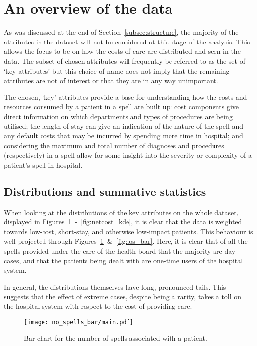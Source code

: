 \section{An overview of the data}\label{sec:overview}

As was discussed at the end of Section~\ref{subsec:structure}, the majority of
the attributes in the dataset will not be considered at this stage of the
analysis. This allows the focus to be on how the costs of care are distributed
and seen in the data. The subset of chosen attributes will frequently be
referred to as the set of `key attributes' but this choice of name does not
imply that the remaining attributes are not of interest or that they are in any
way unimportant.

The chosen, `key' attributes provide a base for understanding how the
costs and resources consumed by a patient in a spell are built up: cost
components give direct information on which departments and types of procedures
are being utilised; the length of stay can give an indication of the nature of
the spell and any default costs that may be incurred by spending more time in
hospital; and considering the maximum and total number of diagnoses and
procedures (respectively) in a spell allow for some insight into the severity or
complexity of a patient's spell in hospital.


\subsection{Distributions and summative statistics}%
\label{subsec:distributions_statistics}

When looking at the distributions of the key attributes on the whole dataset,
displayed in Figures~\ref{fig:no_spells_bar}~\--~\ref{fig:netcost_kde}, it
is clear that the data is weighted towards low-cost, short-stay, and
otherwise low-impact patients. This behaviour is well-projected through
Figures~\ref{fig:no_spells_bar}~\&~\ref{fig:los_bar}. Here, it is clear that of
all the spells provided under the care of the health board that the majority are
day-cases, and that the patients being dealt with are one-time users of the
hospital system.

In general, the distributions themselves have long, pronounced tails. This
suggests that the effect of extreme cases, despite being a rarity, takes a toll
on the hospital system with respect to the cost of providing care.

\begin{figure}[htbp]
    \centering
    \texttt{[image: no\_spells\_bar/main.pdf]}
    \caption{Bar chart for the number of spells associated with a patient.}%
    \label{fig:no_spells_bar}
\end{figure}

